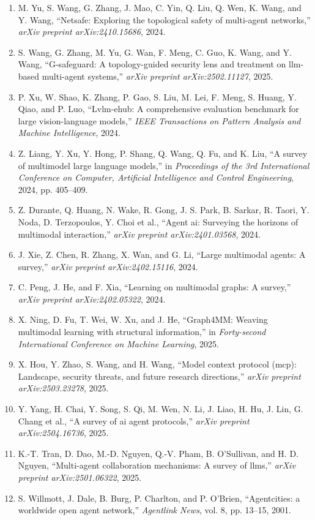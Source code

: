 \documentclass[10pt,UTF8,fontset=fandol]{ctexart}
\begin{document}
\begin{enumerate}[leftmargin=2.4em,labelsep=0.4em,itemsep=0.15em]
\item M. Yu, S. Wang, G. Zhang, J. Mao, C. Yin, Q. Liu, Q. Wen, K. Wang, and Y. Wang, ``Netsafe: Exploring the topological safety of multi-agent networks,'' \textit{arXiv preprint arXiv:2410.15686}, 2024.
\item S. Wang, G. Zhang, M. Yu, G. Wan, F. Meng, C. Guo, K. Wang, and Y. Wang, ``G-safeguard: A topology-guided security lens and treatment on llm-based multi-agent systems,'' \textit{arXiv preprint arXiv:2502.11127}, 2025.
\item P. Xu, W. Shao, K. Zhang, P. Gao, S. Liu, M. Lei, F. Meng, S. Huang, Y. Qiao, and P. Luo, ``Lvlm-ehub: A comprehensive evaluation benchmark for large vision-language models,'' \textit{IEEE Transactions on Pattern Analysis and Machine Intelligence}, 2024.
\item Z. Liang, Y. Xu, Y. Hong, P. Shang, Q. Wang, Q. Fu, and K. Liu, ``A survey of multimodel large language models,'' in \textit{Proceedings of the 3rd International Conference on Computer, Artificial Intelligence and Control Engineering}, 2024, pp. 405--409.
\item Z. Durante, Q. Huang, N. Wake, R. Gong, J. S. Park, B. Sarkar, R. Taori, Y. Noda, D. Terzopoulos, Y. Choi et al., ``Agent ai: Surveying the horizons of multimodal interaction,'' \textit{arXiv preprint arXiv:2401.03568}, 2024.
\item J. Xie, Z. Chen, R. Zhang, X. Wan, and G. Li, ``Large multimodal agents: A survey,'' \textit{arXiv preprint arXiv:2402.15116}, 2024.
\item C. Peng, J. He, and F. Xia, ``Learning on multimodal graphs: A survey,'' \textit{arXiv preprint arXiv:2402.05322}, 2024.
\item X. Ning, D. Fu, T. Wei, W. Xu, and J. He, ``Graph4MM: Weaving multimodal learning with structural information,'' in \textit{Forty-second International Conference on Machine Learning}, 2025.
\item X. Hou, Y. Zhao, S. Wang, and H. Wang, ``Model context protocol (mcp): Landscape, security threats, and future research directions,'' \textit{arXiv preprint arXiv:2503.23278}, 2025.
\item Y. Yang, H. Chai, Y. Song, S. Qi, M. Wen, N. Li, J. Liao, H. Hu, J. Lin, G. Chang et al., ``A survey of ai agent protocols,'' \textit{arXiv preprint arXiv:2504.16736}, 2025.
\item K.-T. Tran, D. Dao, M.-D. Nguyen, Q.-V. Pham, B. O'Sullivan, and H. D. Nguyen, ``Multi-agent collaboration mechanisms: A survey of llms,'' \textit{arXiv preprint arXiv:2501.06322}, 2025.
\item S. Willmott, J. Dale, B. Burg, P. Charlton, and P. O'Brien, ``Agentcities: a worldwide open agent network,'' \textit{Agentlink News}, vol. 8, pp. 13--15, 2001.
\end{enumerate}
\end{document}
